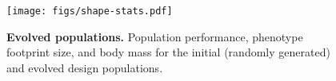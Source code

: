 \begin{figure}[t]
    \centering
    \texttt{[image: figs/shape-stats.pdf]}
    \vspace{-20pt}
    \caption{\textbf{Evolved populations.}
    Population performance, phenotype footprint size, and body mass for the initial (randomly generated) and evolved design populations.
    }
    \vspace{-18pt}
    \label{fig:appendix-robot-data-gen-stats}
\end{figure}